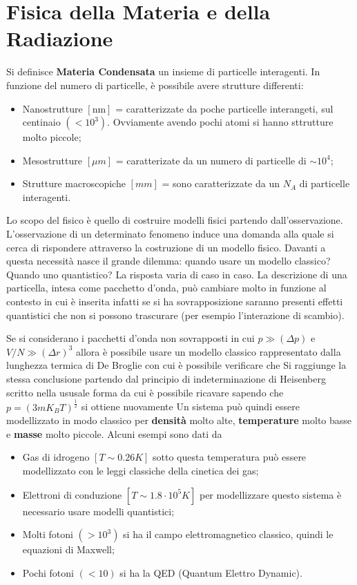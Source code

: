 \documentclass[a4paper,12pt]{article}
\begin{document}
\section{Fisica della Materia e della Radiazione}
Si definisce \textbf{Materia Condensata} un insieme di particelle interagenti. In funzione del numero di particelle, è possibile avere strutture differenti:
\begin{itemize}
	\item Nanostrutture $[\text{nm}]$ = caratterizzate da poche particelle interangeti, sul centinaio $(<10^3)$. Ovviamente avendo pochi atomi si hanno sttrutture molto piccole;
	\item Mesostrutture $[\mu m]$ = caratterizate da un numero di particelle di $\sim  10^4$;
	\item Strutture macroscopiche $[mm]$ = sono caratterizzate da un $N_A$ di particelle interagenti.
\end{itemize}
Lo scopo del fisico è quello di costruire modelli fisici partendo dall'osservazione. L'osservazione di un determinato fenomeno induce una domanda alla quale si cerca di rispondere attraverso la costruzione di un modello fisico. Davanti a questa necessità nasce il grande dilemma: quando usare un modello classico? Quando uno quantistico? La risposta varia di caso in caso. La descrizione di una particella, intesa come pacchetto d'onda, può cambiare molto in funzione al contesto in cui è inserita infatti se si ha sovrapposizione saranno presenti effetti quantistici che non si possono trascurare (per esempio l'interazione di scambio).

Se si considerano i pacchetti d'onda non sovrapposti in cui $p\gg (\Delta p)$ e  $V/N \gg (\Delta r)^3$ allora è possibile usare un modello classico rappresentato dalla lunghezza termica di De Broglie
con cui è possibile verificare che 
Si raggiunge la stessa conclusione partendo dal principio di indeterminazione di Heisenberg scritto nella ususale forma
da cui è possibile ricavare
sapendo che $p=(3mK_BT)^{\frac{1}{2}}$ si ottiene nuovamente
Un sistema può quindi essere modellizzato in modo classico per \textbf{densità} molto alte, \textbf{temperature} molto basse e \textbf{masse} molto piccole. Alcuni esempi sono dati da
\begin{itemize}
	\item Gas di idrogeno $[T\sim 0.26 K]$ sotto questa temperatura può essere modellizzato con le leggi classiche della cinetica dei gas;
	\item Elettroni di conduzione $[T \sim 1.8\cdot 10^5K]$ per modellizzare questo sistema è necessario usare modelli quantistici;
	\item Molti fotoni $(>10^3)$ si ha il campo elettromagnetico classico, quindi le equazioni di Maxwell;
	\item Pochi fotoni $(<10)$ si ha la QED (Quantum Elettro Dynamic).
\end{itemize}
\end{document}
